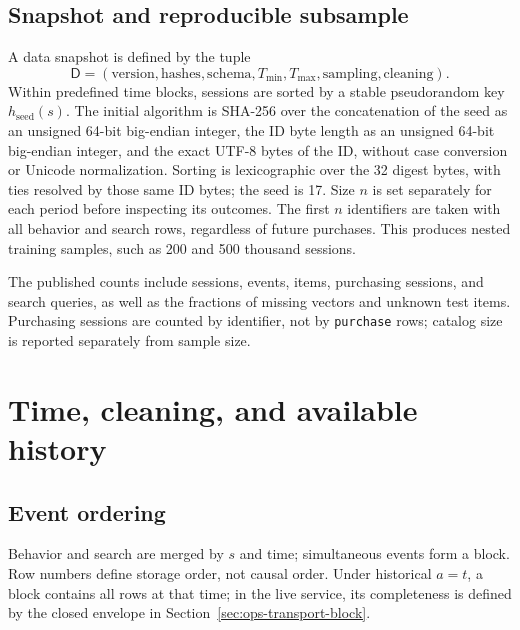 \documentclass[12pt,a4paper]{article}
\newcommand{\code}[1]{{\ttfamily\small\nolinkurl{#1}}}
\theoremstyle{plainru}
\begin{document}
\subsection{Snapshot and reproducible subsample}

A data snapshot is defined by the tuple
\begin{equation}\label{eq:data-snapshot}
\mathsf D=(\mathrm{version},\mathrm{hashes},\mathrm{schema},
T_{\min},T_{\max},\mathrm{sampling},\mathrm{cleaning}).
\end{equation}
Within predefined time blocks, sessions are sorted
by a stable pseudorandom key \(h_{\mathrm{seed}}(s)\).
The initial algorithm is SHA-256 over the concatenation of the seed as an unsigned
64-bit big-endian integer, the ID byte length as an unsigned 64-bit big-endian integer,
and the exact UTF-8 bytes of the ID, without case conversion or Unicode normalization.
Sorting is lexicographic over the 32 digest bytes, with ties resolved
by those same ID bytes; the seed is 17. Size $n$ is set separately
for each period before inspecting its outcomes.
The first \(n\) identifiers are taken with all behavior and search rows,
regardless of future purchases. This produces nested training samples,
such as 200 and 500 thousand sessions.

The published counts include sessions, events, items, purchasing sessions, and search
queries, as well as the fractions of missing vectors and unknown test items.
Purchasing sessions are counted by identifier, not by \code{purchase}
rows; catalog size is reported separately from sample size.

\section{Time, cleaning, and available history}\label{sec:time}

\subsection{Event ordering}

Behavior and search are merged by \(s\) and time; simultaneous events
form a block. Row numbers define storage order, not causal order.
Under historical \(a=t\), a block contains all rows at that time;
in the live service, its completeness is defined by the closed envelope
in Section~\ref{sec:ops-transport-block}.
\end{document}
